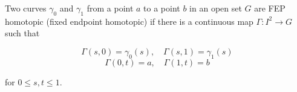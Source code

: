 Two curves $\gamma_0$ and $\gamma_1$ from a point $a$ to a point $b$ in an open set $G$ are FEP homotopic (fixed endpoint homotopic) if there is a continuous map $\Gamma: I^2 \rightarrow G$ such that

$$\Gamma(s, 0) = \gamma_0(s), \quad \Gamma(s, 1) = \gamma_1(s)$$
$$\Gamma(0, t) = a, \quad \Gamma(1, t) = b$$

for $0 \leq s, t \leq 1$.
